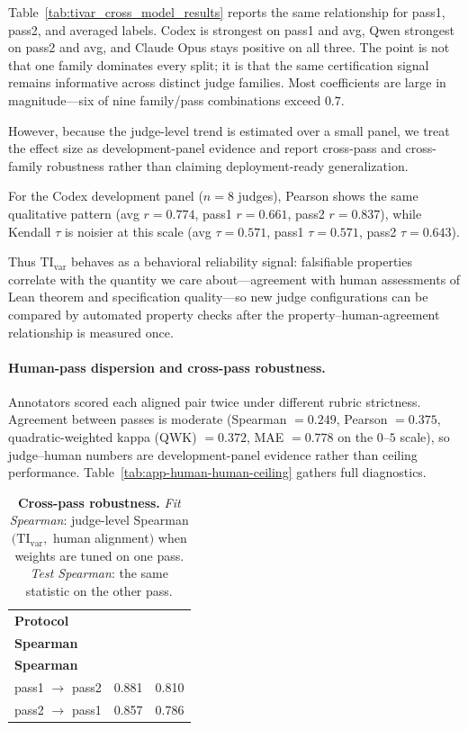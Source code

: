 \documentclass{article}
\begin{document}
Table~\ref{tab:tivar_cross_model_results} reports the same relationship for pass1, pass2, and averaged labels. Codex is strongest on pass1 and avg, Qwen strongest on pass2 and avg, and Claude Opus stays positive on all three. The point is not that one family dominates every split; it is that the same certification signal remains informative across distinct judge families. Most coefficients are large in magnitude---six of nine family/pass combinations exceed \(0.7\).

However, because the judge-level trend is estimated over a small panel, we treat the effect size as development-panel evidence and report cross-pass and cross-family robustness rather than claiming deployment-ready generalization.

For the Codex development panel (\(n=8\) judges), Pearson shows the same qualitative pattern (avg \(r=0.774\), pass1 \(r=0.661\), pass2 \(r=0.837\)), while Kendall \(\tau\) is noisier at this scale (avg \(\tau=0.571\), pass1 \(\tau=0.571\), pass2 \(\tau=0.643\)).

Thus \(\mathrm{TI}_{\mathrm{var}}\) behaves as a behavioral reliability signal: falsifiable properties correlate with the quantity we care about---agreement with human assessments of Lean theorem and specification quality---so new judge configurations can be compared by automated property checks after the property--human-agreement relationship is measured once.

\paragraph{Human-pass dispersion and cross-pass robustness.}
Annotators scored each aligned pair twice under different rubric strictness. Agreement between passes is moderate (Spearman \(=0.249\), Pearson \(=0.375\), quadratic-weighted kappa (QWK) \(=0.372\), MAE \(=0.778\) on the \(0\)--\(5\) scale), so judge--human numbers are development-panel evidence rather than ceiling performance. Table~\ref{tab:app-human-human-ceiling} gathers full diagnostics.

\begin{table}[t]
  \centering
  \small
  \begin{tabular}{lcc}
    \toprule
    \textbf{Protocol}           & \makecell{\textbf{Fit}         \\ \textbf{Spearman}}  & \makecell{\textbf{Test} \\ \textbf{Spearman}} \\
    \midrule
    pass1 \(\rightarrow\) pass2 & 0.881                  & 0.810 \\
    pass2 \(\rightarrow\) pass1 & 0.857                  & 0.786 \\
    \bottomrule
  \end{tabular}
  \caption{\textbf{Cross-pass robustness.}
  \emph{Fit Spearman}: judge-level Spearman\((\mathrm{TI}_{\mathrm{var}},\) human alignment\()\) when weights are tuned on one pass.
  \emph{Test Spearman}: the same statistic on the other pass.}
  \label{tab:cross_pass_generalization}
\end{table}
\end{document}
